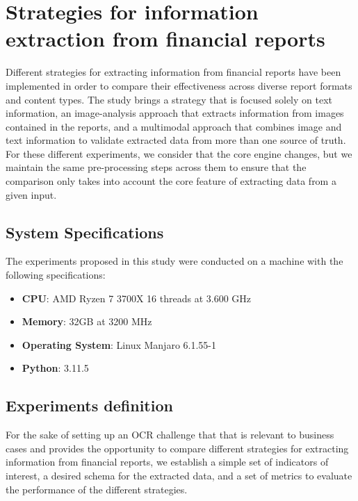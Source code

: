 \documentclass[english, 12pt, a4paper, elec, utf8, a-2b, online]{aaltothesis}
\begin{document}
\clearpage

\section{Strategies for information extraction from financial reports}

Different strategies for extracting information from financial reports have been implemented in order to compare their effectiveness across diverse report formats and content types.
The study brings a strategy that is focused solely on text information, an image-analysis approach that extracts information from images contained in the reports, and a multimodal approach that combines image and text information to validate extracted data from more than one source of truth.
For these different experiments, we consider that the core engine changes, but we maintain the same pre-processing steps across them to ensure that the comparison only takes into account the core feature of extracting data from a given input.

\subsection{System Specifications}

The experiments proposed in this study were conducted on a machine with the following specifications:

\begin{itemize}
    \item \textbf{CPU}: AMD Ryzen 7 3700X 16 threads at 3.600 GHz
    \item \textbf{Memory}: 32GB at 3200 MHz
    \item \textbf{Operating System}: Linux Manjaro 6.1.55-1
    \item \textbf{Python}: 3.11.5
\end{itemize}

\subsection{Experiments definition}

For the sake of setting up an \ac{OCR} challenge that that is relevant to business cases and provides the opportunity to compare different strategies for extracting information from financial reports, we establish a simple set of indicators of interest, a desired schema for the extracted data, and a set of metrics to evaluate the performance of the different strategies.
\end{document}
